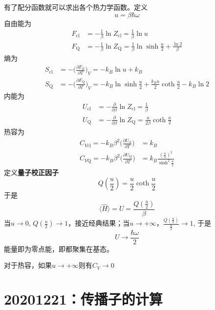 \documentclass[12pt]{article}
\begin{document}
    有了配分函数就可以求出各个热力学函数。定义
    \[ u = \beta\hbar\omega \]
    自由能为
    \begin{equation}\begin{aligned}
        F_\mathrm{cl} &= -\frac 1{\beta} \ln{Z_\mathrm{cl}} = \frac 1{\beta} \ln{u}\\
        F_\mathrm{Q} &= -\frac 1{\beta} \ln{Z_\mathrm{Q}} = \frac 1{\beta}\ln{\sinh{\frac u2}}+ \frac {\ln{2}}{\beta}
    \end{aligned}\end{equation}
    熵为
    \begin{equation}\begin{aligned}
        S_\mathrm{cl} &= -\bigg(\frac {\partial F_{\mathrm{cl}}}{\partial T}\bigg)_V = -k_B \ln{u} + k_B\\
        S_\mathrm{Q} &= -\bigg(\frac {\partial F_{\mathrm{Q}}}{\partial T}\bigg)_V = -k_B \ln{\sinh{\frac u2}} + \frac {k_Bu}2 \coth{\frac u2} - k_B \ln{2}
    \end{aligned}\end{equation}
    内能为
    \begin{equation}\begin{aligned}
        U_\mathrm{cl} &= -\frac {\partial}{\partial \beta}\ln{Z_\mathrm{cl}} = \frac 1{\beta}\\
        U_\mathrm{Q} &= -\frac {\partial}{\partial \beta}\ln{Z_\mathrm{Q}} = \frac {u}{2\beta} \coth{\frac u2}
    \end{aligned}\end{equation}
    热容为
    \begin{equation}\begin{aligned}
        C_{V\mathrm{cl}} = -k_B \beta^2 \bigg(\frac {\partial U_\mathrm{cl}}{\partial T}) &= k_B\\
        C_{V\mathrm{Q}} = -k_B \beta^2 \bigg(\frac {\partial U_\mathrm{Q}}{\partial T}) &= k_B \frac {(\frac u2)^2}{\sinh^2{\frac u2}}
    \end{aligned}\end{equation}
    定义\textbf{量子校正因子}
    \[ Q(\frac u2) = \frac u2 \coth{\frac u2} \]
    于是 
    \[ \langle \hat{H} \rangle = U = \frac {Q(\frac u2)}{\beta} \]
    当$u \to 0$, $Q(\frac u2) \to 1$，接近经典结果；当$u \to +\infty$，$\frac {Q(\frac u2)}{\frac u2} \to 1$, 于是
    \[U \to \frac {\hbar \omega}2 \]
    能量即为零点能，即都聚集在基态。

    对于热容，如果$u \to +\infty$则有$C_V \to 0$

\section{20201221：传播子的计算}
\end{document}
